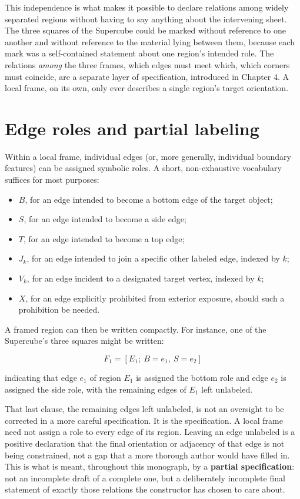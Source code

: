 \documentclass[11pt,oneside]{book}
\providecommand{\tightlist}{%
  \setlength{\itemsep}{0pt}\setlength{\parskip}{0pt}}
\begin{document}
This independence is what makes it possible to declare relations among
widely separated regions without having to say anything about the
intervening sheet. The three squares of the Supercube could be marked
without reference to one another and without reference to the material
lying between them, because each mark was a self-contained statement
about one region's intended role. The relations \emph{among} the three
frames, which edges must meet which, which corners must coincide, are a
separate layer of specification, introduced in Chapter 4. A local frame,
on its own, only ever describes a single region's target orientation.

\hypertarget{edge-roles-and-partial-labeling}{%
\section{Edge roles and partial
labeling}\label{edge-roles-and-partial-labeling}}

Within a local frame, individual edges (or, more generally, individual
boundary features) can be assigned symbolic roles. A short,
non-exhaustive vocabulary suffices for most purposes:

\begin{itemize}
\tightlist
\item
  \(B\), for an edge intended to become a bottom edge of the target
  object;
\item
  \(S\), for an edge intended to become a side edge;
\item
  \(T\), for an edge intended to become a top edge;
\item
  \(J_k\), for an edge intended to join a specific other labeled edge,
  indexed by \(k\);
\item
  \(V_k\), for an edge incident to a designated target vertex, indexed
  by \(k\);
\item
  \(X\), for an edge explicitly prohibited from exterior exposure,
  should such a prohibition be needed.
\end{itemize}

A framed region can then be written compactly. For instance, one of the
Supercube's three squares might be written:

\[F_1 = [E_1;\ B = e_1,\ S = e_2]\]

indicating that edge \(e_1\) of region \(E_1\) is assigned the bottom
role and edge \(e_2\) is assigned the side role, with the remaining
edges of \(E_1\) left unlabeled.

That last clause, the remaining edges left unlabeled, is not an
oversight to be corrected in a more careful specification. It is the
specification. A local frame need not assign a role to every edge of its
region. Leaving an edge unlabeled is a positive declaration that the
final orientation or adjacency of that edge is not being constrained,
not a gap that a more thorough author would have filled in. This is what
is meant, throughout this monograph, by a \textbf{partial
specification}: not an incomplete draft of a complete one, but a
deliberately incomplete final statement of exactly those relations the
constructor has chosen to care about.
\end{document}

